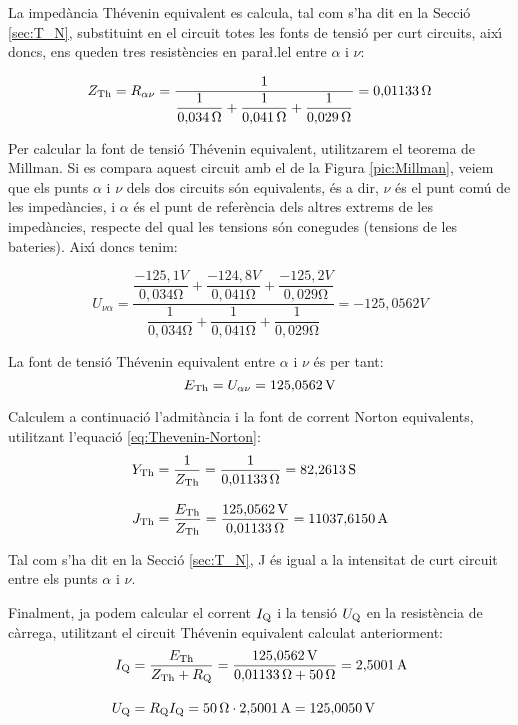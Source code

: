 \begin{exemple}
La imped\`{a}ncia Th\'{e}venin equivalent es calcula, tal com s'ha dit en la Secci\'{o} \ref{sec:T_N},
substituint en el circuit totes les fonts de tensi\'{o} per curt circuits, aix\'{\i} doncs, ens
queden tres resist\`{e}ncies en para{\l.l}el entre $\alpha$ i $\nu$:

\[
Z_\mathrm{Th} = R_{\alpha\nu} =\frac{1}{\dfrac{1}{0{,}034\mathrm{\,\mathrm{\Omega}}} +
\dfrac{1}{0{,}041\mathrm{\,\mathrm{\Omega}}} + \dfrac{1}{0{,}029\mathrm{\,\mathrm{\Omega}}}} =
0{,}01133\mathrm{\,\mathrm{\Omega}}
\]

Per calcular la font de tensi\'{o} Th\'{e}venin equivalent, utilitzarem el
teorema de Millman. Si es compara aquest circuit amb el de la Figura
\vref{pic:Millman}, veiem que els punts $\alpha$ i $\nu$ dels dos
circuits s\'{o}n equivalents, \'{e}s a dir, $\nu$ \'{e}s el punt com\'{u} de les
imped\`{a}ncies, i $\alpha$ \'{e}s el punt de refer\`{e}ncia dels altres extrems
de les imped\`{a}ncies, respecte del qual les tensions s\'{o}n conegudes
(tensions de les bateries). Aix\'{\i} doncs tenim:

\[
U_{\nu\alpha} = \frac{\dfrac{-125{,}1\unit{V}}{0{,}034\unit{\ohm}} +
\dfrac{-124{,}8\unit{V}}{0{,}041\unit{\ohm}} +
\dfrac{-125{,}2\unit{V}}{0{,}029\unit{\ohm}}}{\dfrac{1}{0{,}034\unit{\ohm}}
+ \dfrac{1}{0{,}041\unit{\ohm}} + \dfrac{1}{0{,}029\unit{\ohm}}} =
-125{,}0562\unit{V}
\]

La font de tensi\'{o}  Th\'{e}venin equivalent entre $\alpha$ i $\nu$ \'{e}s per
tant:
\[
E_\mathrm{Th} = U_{\alpha\nu} = 125{,}0562\mathrm{\,V}
\]

Calculem a continuaci\'{o} l'admit\`{a}ncia i la font de corrent  Norton equivalents, utilitzant
l'equaci\'{o} \eqref{eq:Thevenin-Norton}:
\begin{align*}
    Y_\mathrm{Th} &= \frac{1}{Z_\mathrm{Th}} = \frac{1}{0{,}01133\mathrm{\,\mathrm{\Omega}}} = 82{,}2613\mathrm{\,S}
    \\[2ex]
    J_\mathrm{Th} &= \frac{E_\mathrm{Th}}{Z_\mathrm{Th}} =
    \frac{125{,}0562\mathrm{\,V}}{0{,}01133\mathrm{\,\mathrm{\Omega}}}= 11037{,}6150\mathrm{\,A}
\end{align*}

Tal com s'ha dit en la Secci\'{o} \ref{sec:T_N}, J \'{e}s igual a la intensitat de curt
circuit entre els punts $\alpha$ i $\nu$.

Finalment, ja podem calcular el corrent $I_\mathrm{Q}$ i la tensi\'{o} $U_\mathrm{Q}$ en la
resist\`{e}ncia de c\`{a}rrega, utilitzant el circuit Th\'{e}venin equivalent calculat anteriorment:
\begin{align*}
    I_\mathrm{Q} &= \frac{E_\mathrm{Th}}{Z_\mathrm{Th} + R_\mathrm{Q}} = \frac{125{,}0562\mathrm{\,V}}
    {0{,}01133\mathrm{\,\mathrm{\Omega}} + 50\mathrm{\,\mathrm{\Omega}}} = 2{,}5001\mathrm{\,A} \\[2ex]
    U_\mathrm{Q} &=  R_\mathrm{Q} I_\mathrm{Q} = 50\mathrm{\,\mathrm{\Omega}} \cdot 2{,}5001\mathrm{\,A} =
    125{,}0050\mathrm{\,V}
\end{align*}

\end{exemple}


